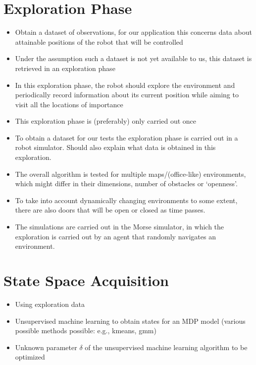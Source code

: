\section{Exploration Phase}
\label{sec:exploration-phase}

% 

\begin{itemize}
	\item Obtain a dataset of observations, for our application this concerns data about attainable positions of the robot that will be controlled
	\item Under the assumption such a dataset is not yet available to us, this dataset is retrieved in an exploration phase
	\item In this exploration phase, the robot should explore the environment and periodically record information about its current position while aiming to visit all the locations of importance
	\item This exploration phase is (preferably) only carried out once
	\item To obtain a dataset for our tests the exploration phase is carried out in a robot simulator. Should also explain what data is obtained in this exploration.
	\item The overall algorithm is tested for multiple maps/(office-like) environments, which might differ in their dimensions, number of obstacles or `openness'.
	\item To take into account dynamically changing environments to some extent, there are also doors that will be open or closed as time passes.
	\item The simulations are carried out in the Morse simulator, in which the exploration is carried out by an agent that randomly navigates an environment.
\end{itemize}

\section{State Space Acquisition}
\label{sec:state-space-aggregation}

% 

\begin{itemize}
	\item Using exploration data
	\item Unsupervised machine learning to obtain states for an MDP model (various possible methods possible: e.g., kmeans, gmm)
	\item Unknown parameter $\delta$ of the unsupervised machine learning algorithm to be optimized
\end{itemize}

